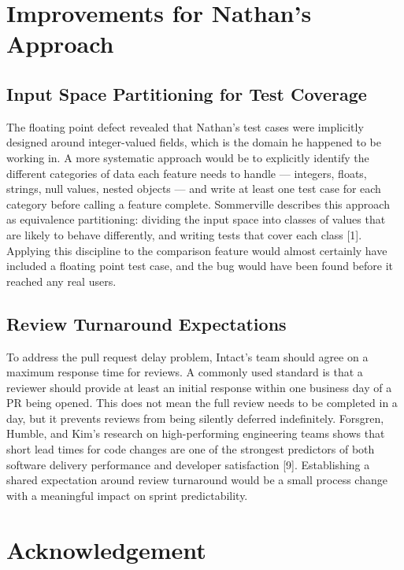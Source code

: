 \documentclass[sigconf]{acmart}
\begin{document}
\section{Improvements for Nathan's Approach}

\subsection{Input Space Partitioning for Test Coverage}

The floating point defect revealed that Nathan's test cases were implicitly designed around integer-valued fields, which is the domain he happened to be working in. A more systematic approach would be to explicitly identify the different categories of data each feature needs to handle — integers, floats, strings, null values, nested objects — and write at least one test case for each category before calling a feature complete. Sommerville describes this approach as equivalence partitioning: dividing the input space into classes of values that are likely to behave differently, and writing tests that cover each class [1]. Applying this discipline to the comparison feature would almost certainly have included a floating point test case, and the bug would have been found before it reached any real users.

\subsection{Review Turnaround Expectations}

To address the pull request delay problem, Intact's team should agree on a maximum response time for reviews. A commonly used standard is that a reviewer should provide at least an initial response within one business day of a PR being opened. This does not mean the full review needs to be completed in a day, but it prevents reviews from being silently deferred indefinitely. Forsgren, Humble, and Kim's research on high-performing engineering teams shows that short lead times for code changes are one of the strongest predictors of both software delivery performance and developer satisfaction [9]. Establishing a shared expectation around review turnaround would be a small process change with a meaningful impact on sprint predictability.

\section{Acknowledgement}
\end{document}
